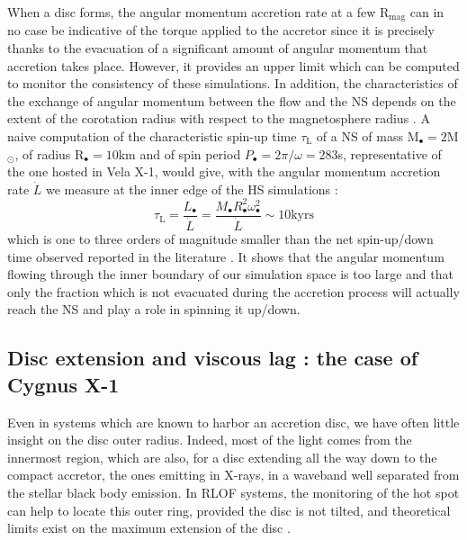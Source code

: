 \documentclass{aa}
\makeatletter
\newcommand*{\rlof}{RLOF\@\xspace}
\newcommand*{\ns}{NS\@\xspace}
\newcommand*{\eg}{e.g.\@\xspace}
\makeatother
\begin{document}
When a disc forms, the angular momentum accretion rate at a few R$_{\text{mag}}$ can in no case be indicative of the torque applied to the accretor since it is precisely thanks to the evacuation of a significant amount of angular momentum that accretion takes place. However, it provides an upper limit which can be computed to monitor the consistency of these simulations. In addition, the characteristics of the exchange of angular momentum between the flow and the \ns depends on the extent of the corotation radius with respect to the magnetosphere radius \citep{Ghosh1979}. A naive computation of the characteristic spin-up time $\tau_{\text{L}}$ of a \ns of mass M$_{\bullet}=2$M$_{\odot}$, of radius R$_{\bullet}=10$km and of spin period $P_{\bullet}=2\pi/\omega=283$s, representative of the one hosted in Vela X-1, would give, with the angular momentum accretion rate $\dot{L}$ we measure at the inner edge of the HS simulations :
\begin{equation}
\tau_{\text{L}}=\frac{L_{\bullet}}{\dot{L}}=\frac{M_{\bullet}R_{\bullet}^2\omega_{\bullet}^2}{\dot{L}}\sim 10\text{kyrs}
\end{equation}
which is one to three orders of magnitude smaller than the net spin-up/down time observed reported in the literature \citep[see \eg][]{Ziolkowski1985}. It shows that the angular momentum flowing through the inner boundary of our simulation space is too large and that only the fraction which is not evacuated during the accretion process will actually reach the \ns and play a role in spinning it up/down.

\subsection{Disc extension and viscous lag : the case of Cygnus X-1}
\label{sec:rout}

Even in systems which are known to harbor an accretion disc, we have often little insight on the disc outer radius. Indeed, most of the light comes from the innermost region, which are also, for a disc extending all the way down to the compact accretor, the ones emitting in X-rays, in a waveband well separated from the stellar black body emission. In \rlof systems, the monitoring of the hot spot can help to locate this outer ring, provided the disc is not tilted, and theoretical limits exist on the maximum extension of the disc \citep[$\sim$70\% of the Roche lobe radius of the accretor,][]{Paczynski1977}. 
\end{document}
